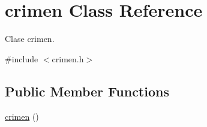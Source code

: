 \hypertarget{classcrimen}{\section{crimen Class Reference}
\label{classcrimen}
}


Clase crimen.  




{\ttfamily \#include $<$crimen.\-h$>$}

\subsection*{Public Member Functions}
\begin{DoxyCompactItemize}
\item 
\hypertarget{classcrimen_ab1147e36869c7e635699e4ef746a7555}{\hyperlink{classcrimen_ab1147e36869c7e635699e4ef746a7555}{crimen} ()}\label{classcrimen_ab1147e36869c7e635699e4ef746a7555}


\end{DoxyCompactItemize}
